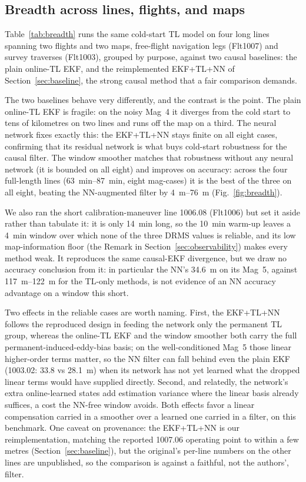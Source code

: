 \documentclass{IEEEtaes}
\begin{document}
\subsection{Breadth across lines, flights, and maps}
Table~\ref{tab:breadth} runs the same cold-start TL model on four long lines
spanning two flights and two maps, free-flight navigation legs (Flt1007) and
survey traverses (Flt1003), grouped by purpose, against two causal
baselines: the plain online-TL EKF, and the reimplemented EKF+TL+NN of
Section~\ref{sec:baseline}, the strong causal method that a fair comparison demands.

The two baselines behave very differently, and the contrast is the point. The
plain online-TL EKF is fragile: on the noisy Mag~4 it diverges from the cold start
to tens of kilometres on two lines and runs off the map on a third. The neural
network fixes exactly this: the EKF+TL+NN stays finite on all eight cases,
confirming that its residual network is what buys cold-start robustness for the
causal filter. The window smoother matches that robustness without any neural
network (it is bounded on all eight) and improves on accuracy: across the four
full-length lines (\SIrange{63}{87}{\minute}, eight mag-cases) it is the best of the
three on all eight, beating the NN-augmented filter by
\SIrange{4}{76}{\meter} (Fig.~\ref{fig:breadth}).

We also ran the short calibration-maneuver line 1006.08 (Flt1006) but set it aside
rather than tabulate it: it is only \SI{14}{\minute} long, so the \SI{10}{\minute}
warm-up leaves a \SI{4}{\minute} window over which none of the three DRMS values is
reliable, and its low map-information floor (the Remark in
Section~\ref{sec:observability}) makes every method weak. It reproduces the same causal-EKF divergence, but we draw no
accuracy conclusion from it: in particular the NN's \SI{34.6}{\meter} on its Mag~5,
against \SIrange{117}{122}{\meter} for the TL-only methods, is not evidence of an NN
accuracy advantage on a window this short.

Two effects in the reliable cases are worth naming. First, the EKF+TL+NN follows
the reproduced design in feeding the network only the permanent TL group,
whereas the online-TL EKF and the window smoother both carry the full
permanent-induced-eddy-bias basis; on the well-conditioned Mag~5 those linear
higher-order terms matter, so the NN filter can fall behind even the plain
EKF (1003.02: $33.8$ vs \SI{28.1}{\meter}) when its network has not yet learned
what the dropped linear terms would have supplied directly. Second, and relatedly,
the network's extra online-learned states add estimation variance where the linear
basis already suffices, a cost the NN-free window avoids. Both effects favor a
linear compensation carried in a smoother over a learned one carried in a filter,
on this benchmark. One caveat on provenance: the EKF+TL+NN is our reimplementation,
matching the reported 1007.06 operating point to within a few metres
(Section~\ref{sec:baseline}), but the original's per-line numbers on the other
lines are unpublished, so the comparison is against a faithful, not the
authors', filter.
\end{document}
